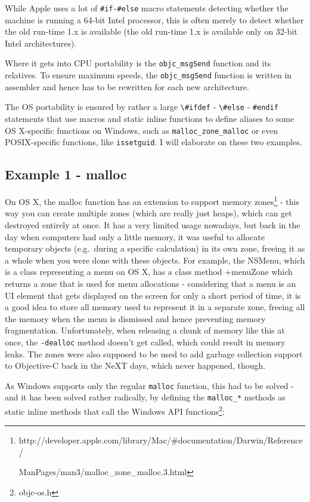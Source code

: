 While Apple uses a lot of \verb=#if-#else= macro statements detecting whether the machine is running a 64-bit Intel processor, this is often merely to detect whether the old run-time 1.x is available (the old run-time 1.x is available only on 32-bit Intel architectures).

Where it gets into CPU portability is the \verb=objc_msgSend= function and its relatives. To ensure maximum speeds, the \verb=objc_msgSend= function is written in assembler and hence has to be rewritten for each new architecture.

The OS portability is ensured by rather a large \verb=\#ifdef= - \verb=\#else= - \verb=#endif= statements that use macros and static inline functions to define aliases to some OS X-specific functions on Windows, such as \verb=malloc_zone_malloc= or even POSIX-specific functions, like \verb=issetguid=. I will elaborate on these two examples.

\subsection{Example 1 - malloc}
On OS X, the malloc function has an extension to support memory zones\footnote{http://developer.apple.com/library/Mac/\#documentation/Darwin/Reference/

ManPages/man3/malloc\_zone\_malloc.3.html} - this way you can create multiple zones (which are really just heaps), which can get destroyed entirely at once. It has a very limited usage nowadays, but back in the day when computers had only a little memory, it was useful to allocate temporary objects (e.g.\ during a specific calculation) in its own zone, freeing it as a whole when you were done with these objects. For example, the NSMenu, which is a class representing a menu on OS X, has a class method +menuZone which returns a zone that is used for menu allocations - considering that a menu is an UI element that gets displayed on the screen for only a short period of time, it is a good idea to store all memory used to represent it in a separate zone, freeing all the memory when the menu is dismissed and hence preventing memory fragmentation. Unfortunately, when releasing a chunk of memory like this at once, the \verb=-dealloc= method doesn't get called, which could result in memory leaks. The zones were also supposed to be used to add garbage collection support to Objective-C back in the NeXT days, which never happened, though.

As Windows supports only the regular \verb=malloc= function, this had to be solved - and it has been solved rather radically, by defining the \verb=malloc_*= methods as static inline methods that call the Windows API functions\footnote{objc-os.h}:

